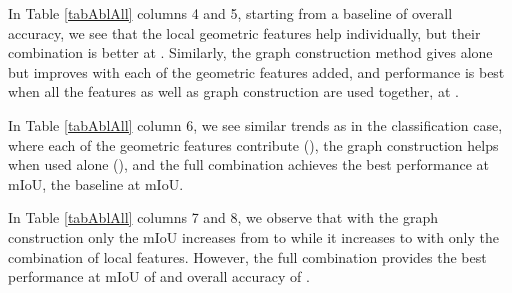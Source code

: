 In Table \ref{tabAblAll} columns 4 and 5, starting from a baseline of  overall accuracy, we see that the local
geometric features help individually, but their combination is better at . Similarly, the
graph construction method gives  alone but improves with each of the geometric features
added, and performance is best when all the features as well as graph construction are used
together, at . 

In Table \ref{tabAblAll} column 6, we see similar trends as in the classification case, where each of the geometric features
contribute (), the graph construction helps when used alone (), and the
full combination achieves the best performance at  mIoU, \cf the baseline at  mIoU.

 In Table \ref{tabAblAll} columns 7 and 8, we observe that
with the graph construction only the mIoU increases from  to  while it increases to
 with only the combination of local features. However, the full combination provides the
best performance at mIoU of  and overall accuracy of .

\begin{table}[h]


\begin{center}
\caption{\small{Ablation study on the training convergence of models}}
\label{tabEpochs}
\vspace{-2em}
\end{center}
\end{table}

